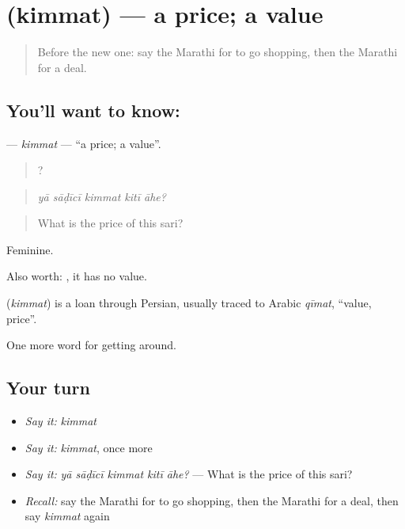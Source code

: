 \section[\texorpdfstring{\mr{किंमत} (kimmat)}{किंमत (kimmat)}]{ (kimmat) — a price; a value}

\label{lesson:MR-C423-kimmat}



\begin{quote}
Before the new one: say the Marathi for to go shopping, then the Marathi for a deal.
\end{quote}

\subsection*{You'll want to know: }
\textbf{} — \emph{kimmat} — \textquotedblleft{}a price; a value\textquotedblright{}.

\begin{quote}
    ?
\end{quote}

\begin{quote}
\emph{yā sāḍīcī kimmat kitī āhe?}
\end{quote}

\begin{quote}
What is the price of this sari?
\end{quote}

Feminine.

Also worth:   , it has no value.

\begin{cousinweb}
\textbf{} (\emph{kimmat}) is a loan through Persian, usually traced to Arabic \emph{qīmat}, \textquotedblleft{}value, price\textquotedblright{}.
\end{cousinweb}

\begin{grammarlens}[title={What you've built}]
One more word for getting around.
\end{grammarlens}

\subsection*{Your turn}
\begin{itemize}
\raggedright
  \item \emph{Say it:} \emph{kimmat}
  \item \emph{Say it:} \emph{kimmat}, once more
  \item \emph{Say it:} \emph{yā sāḍīcī kimmat kitī āhe?} — What is the price of this sari?
  \item \emph{Recall:} say the Marathi for to go shopping, then the Marathi for a deal, then say \emph{kimmat} again
\end{itemize}

